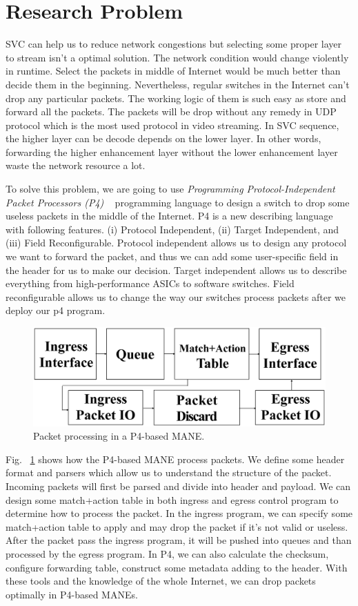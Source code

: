 \section{Research Problem} \label{sec:Remark Problem}

SVC can help us to reduce network congestions but selecting some proper layer to stream isn't a optimal solution. The network condition would change violently in runtime. Select the packets in middle of Internet would be much better than decide them in the beginning. Nevertheless, regular switches in the Internet can't drop any particular packets. The working logic of them is such easy as store and forward all the packets. The packets will be drop without any remedy in UDP protocol which is the most used protocol in video streaming. In SVC sequence, the higher layer can be decode depends on the lower layer. In other words, forwarding the higher enhancement layer without the lower enhancement layer waste the network resource a lot. 

To solve this problem, we are going to use {\em Programming Protocol-Independent Packet Processors (P4)} ~\cite{BDGI+14} programming language to design a switch to drop some useless packets in the middle of the Internet. P4 is a new describing language with following features. (i) Protocol Independent, (ii) Target Independent, and (iii) Field Reconfigurable. Protocol independent allows us to design any protocol we want to forward the packet, and thus we can add some user-specific field in the header for us to make our decision. Target independent allows us to describe everything from high-performance ASICs to software switches. Field reconfigurable allows us to change the way our switches process packets after we deploy our p4 program. 

\begin{figure}[tbh]
    \centering
    \includegraphics[width=.24\textwidth]{fig/MANE_1.eps}
    \caption{Packet processing in a P4-based MANE.}
    \label{MANE}
\end{figure}

Fig. ~\ref{MANE} shows how the P4-based MANE process packets. We define some header format and parsers which allow us to understand the structure of the packet. Incoming packets will first be parsed and divide into header and payload. We can design some match+action table in both ingress and egress control program to determine how to process the packet. In the ingress program, we can specify some match+action table to apply and may drop the packet if it's not valid or useless. After the packet pass the ingress program, it will be pushed into queues and than processed by the egress program. In P4, we can also calculate the checksum, configure forwarding table, construct some metadata adding to the header. With these tools and the knowledge of the whole Internet,  we can drop packets optimally in P4-based MANEs. 

